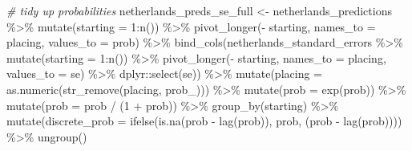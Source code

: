 \documentclass[
]{book}
\newenvironment{Shaded}{\begin{snugshade}}{\end{snugshade}}
\newcommand{\AttributeTok}[1]{\textcolor[rgb]{0.77,0.63,0.00}{#1}}
\newcommand{\CommentTok}[1]{\textcolor[rgb]{0.56,0.35,0.01}{\textit{#1}}}
\newcommand{\DecValTok}[1]{\textcolor[rgb]{0.00,0.00,0.81}{#1}}
\newcommand{\FunctionTok}[1]{\textcolor[rgb]{0.00,0.00,0.00}{#1}}
\newcommand{\NormalTok}[1]{#1}
\newcommand{\OtherTok}[1]{\textcolor[rgb]{0.56,0.35,0.01}{#1}}
\newcommand{\SpecialCharTok}[1]{\textcolor[rgb]{0.00,0.00,0.00}{#1}}
\newcommand{\StringTok}[1]{\textcolor[rgb]{0.31,0.60,0.02}{#1}}
\begin{document}
\begin{Shaded}
\begin{Highlighting}[]
\CommentTok{\# tidy up probabilities}
\NormalTok{netherlands\_preds\_se\_full }\OtherTok{\textless{}{-}}\NormalTok{ netherlands\_predictions }\SpecialCharTok{\%\textgreater{}\%}
  \FunctionTok{mutate}\NormalTok{(}\AttributeTok{starting =} \DecValTok{1}\SpecialCharTok{:}\FunctionTok{n}\NormalTok{()) }\SpecialCharTok{\%\textgreater{}\%}
  \FunctionTok{pivot\_longer}\NormalTok{(}\SpecialCharTok{{-}}\NormalTok{ starting, }\AttributeTok{names\_to =} \StringTok{\textquotesingle{}placing\textquotesingle{}}\NormalTok{, }\AttributeTok{values\_to =} \StringTok{\textquotesingle{}prob\textquotesingle{}}\NormalTok{) }\SpecialCharTok{\%\textgreater{}\%} 
  \FunctionTok{bind\_cols}\NormalTok{(netherlands\_standard\_errors }\SpecialCharTok{\%\textgreater{}\%} \FunctionTok{mutate}\NormalTok{(}\AttributeTok{starting =} \DecValTok{1}\SpecialCharTok{:}\FunctionTok{n}\NormalTok{()) }\SpecialCharTok{\%\textgreater{}\%}
  \FunctionTok{pivot\_longer}\NormalTok{(}\SpecialCharTok{{-}}\NormalTok{ starting, }\AttributeTok{names\_to =} \StringTok{\textquotesingle{}placing\textquotesingle{}}\NormalTok{, }\AttributeTok{values\_to =} \StringTok{\textquotesingle{}se\textquotesingle{}}\NormalTok{) }\SpecialCharTok{\%\textgreater{}\%}
\NormalTok{    dplyr}\SpecialCharTok{::}\FunctionTok{select}\NormalTok{(se)) }\SpecialCharTok{\%\textgreater{}\%}
  \FunctionTok{mutate}\NormalTok{(}\AttributeTok{placing =} \FunctionTok{as.numeric}\NormalTok{(}\FunctionTok{str\_remove}\NormalTok{(placing, }\StringTok{\textquotesingle{}prob\_\textquotesingle{}}\NormalTok{))) }\SpecialCharTok{\%\textgreater{}\%}
  \FunctionTok{mutate}\NormalTok{(}\AttributeTok{prob =} \FunctionTok{exp}\NormalTok{(prob)) }\SpecialCharTok{\%\textgreater{}\%}
  \FunctionTok{mutate}\NormalTok{(}\AttributeTok{prob =}\NormalTok{ prob }\SpecialCharTok{/}\NormalTok{ (}\DecValTok{1} \SpecialCharTok{+}\NormalTok{ prob)) }\SpecialCharTok{\%\textgreater{}\%}
  \FunctionTok{group\_by}\NormalTok{(starting) }\SpecialCharTok{\%\textgreater{}\%} 
  \FunctionTok{mutate}\NormalTok{(}\AttributeTok{discrete\_prob =} \FunctionTok{ifelse}\NormalTok{(}\FunctionTok{is.na}\NormalTok{(prob }\SpecialCharTok{{-}} \FunctionTok{lag}\NormalTok{(prob)), prob, (prob }\SpecialCharTok{{-}} \FunctionTok{lag}\NormalTok{(prob)))) }\SpecialCharTok{\%\textgreater{}\%}
  \FunctionTok{ungroup}\NormalTok{()}


\end{Highlighting}
\end{Shaded}
\end{document}
